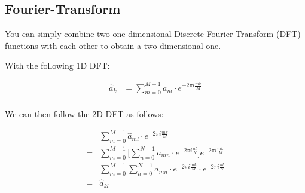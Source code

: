 \documentclass[a4paper,12pt]{article}
\begin{document}
	\subsection{Fourier-Transform}
	
	You can simply combine two one-dimensional Discrete Fourier-Transform (DFT) functions with each other to obtain a two-dimensional one.

	With the following 1D DFT:
	
	\begin{align*}
		\hat{a}_{k} &= \sum\limits_{m = 0}^{M - 1} a_m \cdot e^{-2 \pi i \frac{mk}{M}} \\
	\end{align*}
	
	We can then follow the 2D DFT as follows:
	
	\begin{align*}
	&\sum\limits_{m = 0}^{M - 1} \hat{a}_{ml} \cdot e^{-2 \pi i \frac{mk}{M}} \\
	=&\sum\limits_{m = 0}^{M - 1} \Big[ \sum\limits_{n = 0}^{N - 1} a_{mn} \cdot e^{-2 \pi i \frac{nl}{N}} \Big] e^{-2 \pi i \frac{mk}{M}} \\
	=& \sum\limits_{m = 0}^{M - 1} \sum\limits_{n = 0}^{N - 1} a_{mn} \cdot e^{-2 \pi i \frac{mk}{M}} \cdot e^{-2 \pi i \frac{nl}{N}} \\
	=& \hat{a}_{kl}
	\end{align*}
\end{document}
